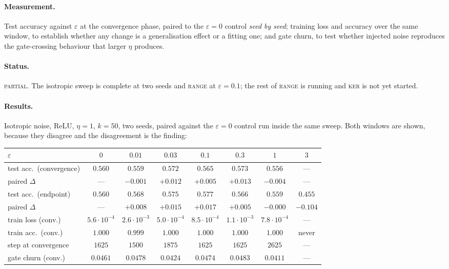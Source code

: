 \documentclass{article} %
\theoremstyle{plain}
\theoremstyle{definition}
\theoremstyle{remark}
\begin{document}
\paragraph{Measurement.}
Test accuracy against $\varepsilon$ at the convergence phase, paired to the $\varepsilon = 0$
control \emph{seed by seed}; training loss and accuracy over the same window, to establish whether
any change is a generalisation effect or a fitting one; and gate churn, to test whether injected
noise reproduces the gate-crossing behaviour that larger $\eta$ produces.

\paragraph{Status.} \textsc{partial}. The isotropic sweep is complete at two seeds and
\textsc{range} at $\varepsilon = 0.1$; the rest of \textsc{range} is running and \textsc{ker} is
not yet started.

\paragraph{Results.} Isotropic noise, ReLU, $\eta = 1$, $k = 50$, two seeds, paired against the
$\varepsilon = 0$ control run inside the same sweep. Both windows are shown, because they disagree
and the disagreement is the finding:

\begin{center}\small
\begin{tabular}{lccccccc}
\toprule
$\varepsilon$ & $0$ & $0.01$ & $0.03$ & $0.1$ & $0.3$ & $1$ & $3$ \\
\midrule
test acc.\ (convergence)  & $0.560$ & $0.559$ & $\mathbf{0.572}$ & $0.565$ & $\mathbf{0.573}$ & $0.556$ & --- \\
paired $\Delta$           & ---     & $-0.001$ & $+0.012$ & $+0.005$ & $+0.013$ & $-0.004$ & --- \\
\midrule
test acc.\ (endpoint)     & $0.560$ & $0.568$ & $0.575$ & $\mathbf{0.577}$ & $0.566$ & $0.559$ & $0.455$ \\
paired $\Delta$           & ---     & $+0.008$ & $+0.015$ & $\mathbf{+0.017}$ & $+0.005$ & $-0.000$ & $-0.104$ \\
\midrule
train loss (conv.)        & $5.6\cdot10^{-4}$ & $2.6\cdot10^{-3}$ & $5.0\cdot10^{-4}$
                          & $8.5\cdot10^{-4}$ & $1.1\cdot10^{-3}$ & $7.8\cdot10^{-4}$ & --- \\
train acc.\ (conv.)       & $1.000$ & $0.999$ & $1.000$ & $1.000$ & $1.000$ & $1.000$ & never \\
step at convergence       & $1625$ & $1500$ & $1875$ & $1625$ & $1625$ & $2625$ & --- \\
gate churn (conv.)        & $0.0461$ & $0.0478$ & $0.0424$ & $0.0474$ & $0.0483$ & $0.0411$ & --- \\
\bottomrule
\end{tabular}
\end{center}
\end{document}
